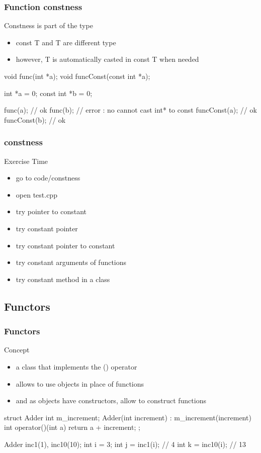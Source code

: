 \begin{frame}[fragile]
  \frametitle{Function constness}
  \begin{block}{Constness is part of the type}
    \begin{itemize}
    \item const T and T are different type
    \item however, T is automatically casted in const T when needed
    \end{itemize}
  \end{block}
  \begin{cppcode}
    void func(int *a);
    void funcConst(const int *a);

    int *a = 0;
    const int *b = 0;

    func(a);      // ok
    func(b);      // error : no cannot cast int* to const
    funcConst(a); // ok
    funcConst(b); // ok
  \end{cppcode}
\end{frame}


\begin{frame}[fragile]
  \frametitle{constness}
  \begin{alertblock}{Exercise Time}
    \begin{itemize}
    \item go to code/constness
    \item open test.cpp
    \item try pointer to constant
    \item try constant pointer
    \item try constant pointer to constant
    \item try constant arguments of functions
    \item try constant method in a class
    \end{itemize}
  \end{alertblock}
\end{frame}

\subsection[Functors]{Functors}

\begin{frame}[fragile]
  \frametitle{Functors}
  \begin{block}{Concept}
    \begin{itemize}
    \item a class that implements the () operator
    \item allows to use objects in place of functions
    \item and as objects have constructors, allow to construct functions
    \end{itemize}
  \end{block}
  \begin{cppcode}
    struct Adder {
      int m_increment;
      Adder(int increment) : m_increment(increment) {}
      int operator()(int a) { return a + increment; }
    };
    
    Adder inc1(1), inc10(10);
    int i = 3;
    int j = inc1(i);  // 4
    int k = inc10(i); // 13
  \end{cppcode}
\end{frame}

